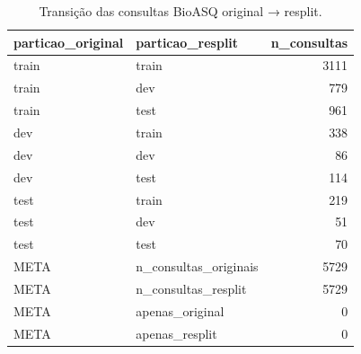\begin{table}
\caption{Transição das consultas BioASQ original → resplit.}
\label{tab:tabela_bioasq_fluxo_resplit}
\begin{tabular}{llr}
\toprule
particao\_original & particao\_resplit & n\_consultas \\
\midrule
train & train & 3111 \\
train & dev & 779 \\
train & test & 961 \\
dev & train & 338 \\
dev & dev & 86 \\
dev & test & 114 \\
test & train & 219 \\
test & dev & 51 \\
test & test & 70 \\
META & n\_consultas\_originais & 5729 \\
META & n\_consultas\_resplit & 5729 \\
META & apenas\_original & 0 \\
META & apenas\_resplit & 0 \\
\bottomrule
\end{tabular}
\end{table}

